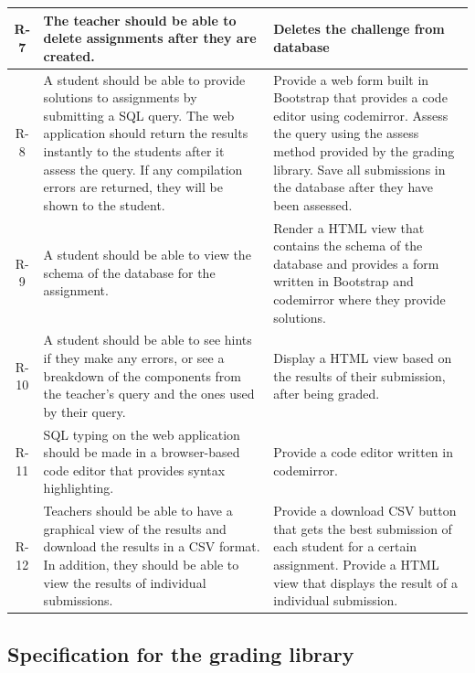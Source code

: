 \begin{tabularx}{\textwidth}{|c|Y|Y|}
  R-7 & The teacher should be able to delete assignments after they are created. & Deletes the challenge from database \\\hline
  R-8 & A student should be able to provide solutions to assignments by submitting a SQL query. The web application should return the results instantly to the students after it assess the query. If any compilation errors are returned, they will be shown to the student. & Provide a web form built in Bootstrap that provides a code editor using codemirror. Assess the query using the assess method provided by the grading library. Save all submissions in the database after they have been assessed. \\\hline
  R-9 & A student should be able to view the schema of the database for the assignment. & Render a HTML view that contains the schema of the database and provides a form written in Bootstrap and codemirror where they provide solutions. \\\hline
  R-10 & A  student  should  be  able  to  see  hints  if  they make any  errors, or see a breakdown of the components from the teacher’s query and the ones used by their query. & Display a HTML view based on the results of their submission, after being graded. \\\hline
  R-11 & SQL typing on the web application should be made in a browser-based code editor that provides syntax highlighting. & Provide a code editor written in codemirror. \\\hline
  R-12 & Teachers should be able to have a graphical view of the results and download the results in  a CSV format.   In  addition,  they  should  be  able  to  view  the  results  of individual submissions. & Provide a download CSV button that gets the best submission of each student for a certain assignment. Provide a HTML view that displays the result of a individual submission. \\\hline
\end{tabularx}

\subsection{Specification for the grading library}

